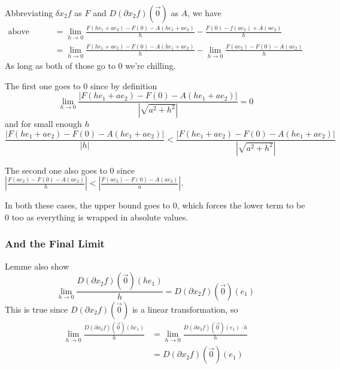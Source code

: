 \documentclass[12pt]{article}
\begin{document}
Abbreviating $\delta x_2 f$ as $F$ and $D(\partial x_2 f)(\vec{0})$ as $A$, we have
\begin{align*}
  \text{above limit}
  &= \lim_{h \to 0} \frac{F(he_1+ae_2)-F(0)-A(he_1+ae_2)}{h} - \frac{F(0)-f(ae_2)+A(ae_2)}{h} \\
  &= \lim_{h \to 0} \frac{F(he_1+ae_2)-F(0)-A(he_1+ae_2)}{h} - \lim_{h \to 0} \frac{F(ae_2)-F(0)-A(ae_2)}{h}
\end{align*}
As long as both of those go to $0$ we're chilling.

The first one goes to $0$ since by definition
\[\lim_{h \to 0} \frac{|F(he_1+ae_2)-F(0)-A(he_1+ae_2)|}{\left|\sqrt{a^2+h^2}\right|}=0\]
and for small enough $h$
\[\frac{|F(he_1+ae_2)-F(0)-A(he_1+ae_2)|}{\left|h\right|}
< \frac{|F(he_1+ae_2)-F(0)-A(he_1+ae_2)|}{\left|\sqrt{a^2+h^2}\right|}\]

The second one also goes to $0$ since
$\left|\frac{F(ae_2)-F(0)-A(ae_2)}{h}\right|
< \left|\frac{F(ae_2)-F(0)-A(ae_2)}{a}\right|$.

In both these cases, the upper bound goes to $0$, which forces the
lower term to be $0$ too as everything is wrapped in absolute values.

\subsubsection{And the Final Limit}

Lemme also show
\[\lim_{h \to 0} \frac{D(\partial x_2 f)(\vec{0})(he_1)}{h}
= D(\partial x_2 f)(\vec{0})(e_1)\]
This is true since $D(\partial x_2 f)(\vec{0})$ is a linear transformation, so
\begin{align*}
  \lim_{h \to 0} \frac{D(\partial x_2 f)(\vec{0})(he_1)}{h}
  &= \lim_{h \to 0} \frac{D(\partial x_2 f)(\vec{0})(e_1) \cdot h}{h} \\
  &= D(\partial x_2 f)(\vec{0})(e_1)
\end{align*}
\end{document}
